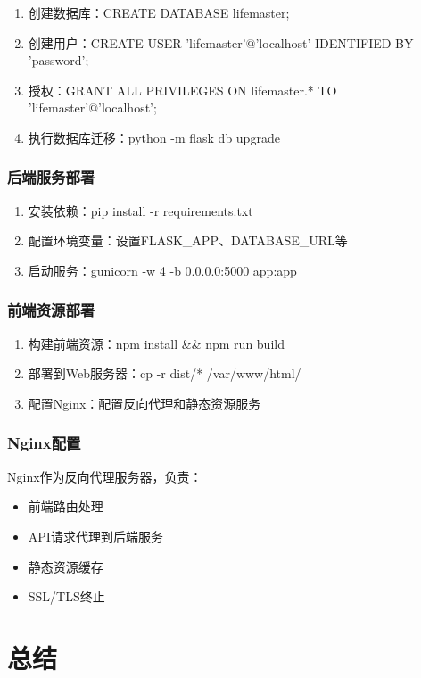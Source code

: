 \documentclass[a4paper]{article}
\begin{document}
\begin{enumerate}
    \item 创建数据库：CREATE DATABASE lifemaster;
    \item 创建用户：CREATE USER 'lifemaster'@'localhost' IDENTIFIED BY 'password';
    \item 授权：GRANT ALL PRIVILEGES ON lifemaster.* TO 'lifemaster'@'localhost';
    \item 执行数据库迁移：python -m flask db upgrade
\end{enumerate}

\subsubsection{后端服务部署}

\begin{enumerate}
    \item 安装依赖：pip install -r requirements.txt
    \item 配置环境变量：设置FLASK\_APP、DATABASE\_URL等
    \item 启动服务：gunicorn -w 4 -b 0.0.0.0:5000 app:app
\end{enumerate}

\subsubsection{前端资源部署}

\begin{enumerate}
    \item 构建前端资源：npm install \&\& npm run build
    \item 部署到Web服务器：cp -r dist/* /var/www/html/
    \item 配置Nginx：配置反向代理和静态资源服务
\end{enumerate}

\subsubsection{Nginx配置}

Nginx作为反向代理服务器，负责：
\begin{itemize}
    \item 前端路由处理
    \item API请求代理到后端服务
    \item 静态资源缓存
    \item SSL/TLS终止
\end{itemize}

\section{总结}
\end{document}

